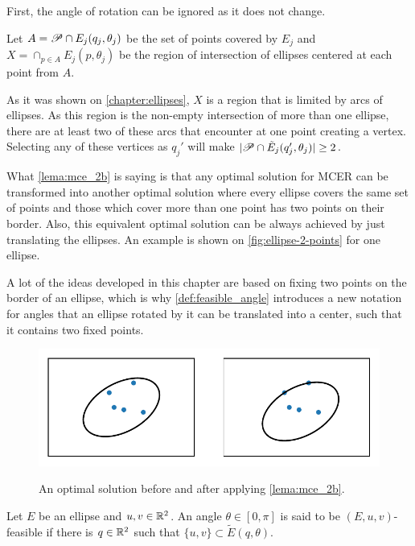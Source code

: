 \begin{demonstracao}
	First, the angle of rotation can be ignored as it does not change.
	
	Let $A=\mathscr{P} \cap E_j(q_j, \theta_j)$ be the set of points covered by $E_j$ and $X=\cap_{p \in A}E_j(p, \theta_j)$ be the region of intersection of ellipses centered at each point from $A$.

	As it was shown on \autoref{chapter:ellipses}, $X$ is a region that is limited by arcs of ellipses. As this region is the non-empty intersection of more than one ellipse, there are at least two of these arcs that encounter at one point creating a vertex. Selecting any of these vertices as $q_j'$ will make $|\mathscr{P} \cap \tilde{E}_j(q_j', \theta_j)| \ge 2$.
	
\end{demonstracao}

What \autoref{lema:mce_2b} is saying is that any optimal solution for MCER can be transformed into another optimal solution where every ellipse covers the same set of points and those which cover more than one point has two points on their border. Also, this equivalent optimal solution can be always achieved by just translating the ellipses. An example is shown on \autoref{fig:ellipse-2-points} for one ellipse.

A lot of the ideas developed in this chapter are based on fixing two points on the border of an ellipse, which is why \autoref{def:feasible_angle} introduces a new notation for angles that an ellipse rotated by it can be translated into a center, such that it contains two fixed points. 

\begin{figure}[H]
	\centering
	\caption{An optimal solution before and after applying \autoref{lema:mce_2b}.}
	\includegraphics{tex/figures/scripts/ellipse-2-points}
	\fautor
	\label{fig:ellipse-2-points}
\end{figure}



\begin{definicao}\label{def:feasible_angle}
	Let $E$ be an ellipse and $u, v \in \mathbb{R}^2$. An angle $\theta \in [0, \pi]$ is said to be $(E, u, v)$-feasible if there is $q \in \mathbb{R}^2$ such that $\{u, v\} \subset \tilde{E}(q, \theta)$.
\end{definicao}

